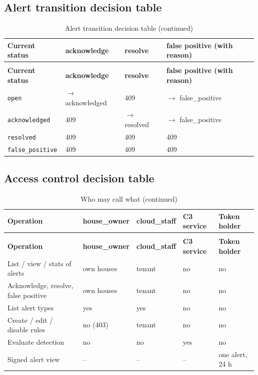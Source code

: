 \subsection{Alert transition decision table}
\begin{longtable}{L{3.2cm}L{3.4cm}L{3.4cm}L{4.6cm}}
\caption{Alert transition decision table}\label{tab:c2-dt-trans}\\
\toprule
\textbf{Current status} & \textbf{acknowledge} & \textbf{resolve} & \textbf{false positive (with reason)} \\
\midrule
\endfirsthead
\caption[]{Alert transition decision table (continued)}\\
\toprule
\textbf{Current status} & \textbf{acknowledge} & \textbf{resolve} & \textbf{false positive (with reason)} \\
\midrule
\endhead
\texttt{open} & $\rightarrow$ acknowledged & 409 & $\rightarrow$ false\_positive \\
\texttt{acknowledged} & 409 & $\rightarrow$ resolved & $\rightarrow$ false\_positive \\
\texttt{resolved} & 409 & 409 & 409 \\
\texttt{false\_positive} & 409 & 409 & 409 \\
\bottomrule
\end{longtable}

\subsection{Access control decision table}
\begin{longtable}{L{4.6cm}L{2.5cm}L{2.5cm}L{2.4cm}L{2.6cm}}
\caption{Who may call what}\label{tab:c2-access}\\
\toprule
\textbf{Operation} & \textbf{house\_owner} & \textbf{cloud\_staff} & \textbf{C3 service} & \textbf{Token holder} \\
\midrule
\endfirsthead
\caption[]{Who may call what (continued)}\\
\toprule
\textbf{Operation} & \textbf{house\_owner} & \textbf{cloud\_staff} & \textbf{C3 service} & \textbf{Token holder} \\
\midrule
\endhead
List / view / stats of alerts & own houses & tenant & no & no \\
Acknowledge, resolve, false positive & own houses & tenant & no & no \\
List alert types & yes & yes & no & no \\
Create / edit / disable rules & no (403) & tenant & no & no \\
Evaluate detection & no & no & yes & no \\
Signed alert view & -- & -- & -- & one alert, 24 h \\
\bottomrule
\end{longtable}

